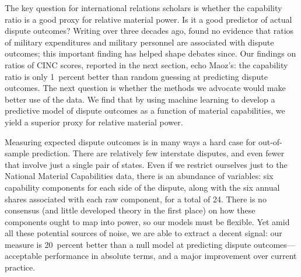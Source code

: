 The key question for international relations scholars is whether the capability ratio is a good proxy for relative material power.
Is it a good predictor of actual dispute outcomes?
Writing over three decades ago, \citet{Maoz:1983cw} found no evidence that ratios of military expenditures and military personnel are associated with dispute outcomes; this important finding has helped shape debates since.
Our findings on ratios of CINC scores, reported in the next section, echo Maoz's: the capability ratio is only 1~percent better than random guessing at predicting dispute outcomes.
The next question is whether the methods we advocate would make better use of the data.
We find that by using machine learning to develop a predictive model of dispute outcomes as a function of material capabilities, we yield a superior proxy for relative material power.

Measuring expected dispute outcomes is in many ways a hard case for out-of-sample prediction.
There are relatively few interstate disputes, and even fewer that involve just a single pair of states.
Even if we restrict ourselves just to the National Material Capabilities data, there is an abundance of variables: six capability components for each side of the dispute, along with the six annual shares associated with each raw component, for a total of 24.
There is no consensus (and little developed theory in the first place) on how these components ought to map into power, so our models must be flexible.
Yet amid all these potential sources of noise, we are able to extract a decent signal: our measure is 20~percent better than a null model at predicting dispute outcomes---acceptable performance in absolute terms, and a major improvement over current practice.


